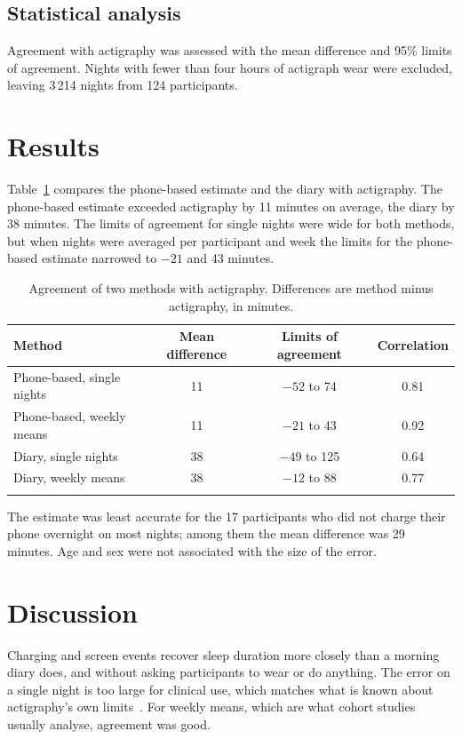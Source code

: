 \documentclass[pdflatex,sn-mathphys-num]{sn-jnl}
\begin{document}
\subsection{Statistical analysis}
Agreement with actigraphy was assessed with the mean difference and 95\% limits of agreement. Nights with fewer than four hours of actigraph wear were excluded, leaving 3\,214 nights from 124 participants.

\section{Results}\label{sec:results}
Table~\ref{tab:agreement} compares the phone-based estimate and the diary with actigraphy. The phone-based estimate exceeded actigraphy by 11 minutes on average, the diary by 38 minutes. The limits of agreement for single nights were wide for both methods, but when nights were averaged per participant and week the limits for the phone-based estimate narrowed to $-21$ and 43 minutes.

\begin{table}[t]
\caption{Agreement of two methods with actigraphy. Differences are method minus actigraphy, in minutes.}\label{tab:agreement}
\begin{tabular}{@{}lccc@{}}
\toprule
Method & Mean difference & Limits of agreement & Correlation \\
\midrule
Phone-based, single nights & 11 & $-52$ to 74 & 0.81 \\
Phone-based, weekly means  & 11 & $-21$ to 43 & 0.92 \\
Diary, single nights       & 38 & $-49$ to 125 & 0.64 \\
Diary, weekly means        & 38 & $-12$ to 88 & 0.77 \\
\botrule
\end{tabular}
\end{table}

The estimate was least accurate for the 17 participants who did not charge their phone overnight on most nights; among them the mean difference was 29 minutes. Age and sex were not associated with the size of the error.

\section{Discussion}\label{sec:discussion}
Charging and screen events recover sleep duration more closely than a morning diary does, and without asking participants to wear or do anything. The error on a single night is too large for clinical use, which matches what is known about actigraphy's own limits~\cite{sadeh2011role}. For weekly means, which are what cohort studies usually analyse, agreement was good.
\end{document}
